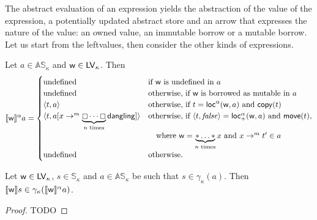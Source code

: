 The abstract evaluation of an expression yields the abstraction of the
value of the expression, a potentially updated abstract store
and an arrow that expresses the nature of the value: an owned value, an immutable borrow
or a mutable borrow. Let us start from the leftvalues, then consider the other kinds of
expressions.

\begin{definition}\label{def:abstract_semantics_leftvalues}
  Let $a\in\mathbb{AS}_\kappa$ and $\mathsf{w}\in\Leftvalues_\kappa$. Then
  \[
  \dena[\mathsf{w}]{a}=\begin{cases}
  \text{undefined} & \text{if $\mathsf{w}$ is undefined in $a$}\\
  \text{undefined} & \text{otherwise, if $\mathsf{w}$ is borrowed as mutable in $a$}\\
  \langle t, a\rangle & \text{otherwise, if $t=\loca(\mathsf{w},a)$ and $\copytype(t)$}\\
  \langle t, a[x\to^m\underbrace{\boxempty\cdots\boxempty}_{n\text{ times}}\mathsf{dangling}]\rangle & \text{otherwise, if $\langle t,\mathit{false}\rangle=\locreada(\mathsf{w},a)$ and $\movetype(t)$,}\\
  & \quad\text{where $\mathsf{w}=\underbrace{*\ldots*}_{n\text{ times}}x$ and $x\to^mt'\in a$}\\
  \text{undefined} & \text{otherwise.}
  \end{cases}
  \]
\end{definition}

\begin{proposition}
  \label{prop:abstract_leftvalues_correctness}
  Let $\mathsf{w}\in\Leftvalues_\kappa$, $s\in\mathbb{S}_\kappa$
  and $a\in\mathbb{AS}_\kappa$ be
  such that $s\in\gamma_\kappa(a)$.
  Then $\den[\mathsf{w}]{s}\in\gamma_\kappa(\dena[\mathsf{w}]{a})$.
\end{proposition}
\begin{proof}
  TODO
\end{proof}
